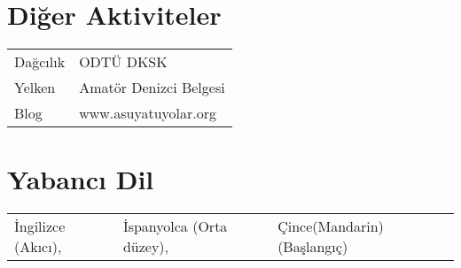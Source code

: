 \documentclass[a4paper,12pt]{article}
\begin{document}
\section{Diğer Aktiviteler}
%
 \begin{tabular}{ll}
Dağcılık & ODTÜ DKSK\\
Yelken & Amatör Denizci Belgesi\\
Blog & www.asuyatuyolar.org\\
\end{tabular}

\section{Yabancı Dil}
\begin{tabular}{lll} 
İngilizce (Akıcı), & İspanyolca (Orta düzey), & Çince(Mandarin) (Başlangıç)
\end{tabular}

\clearpage

\begin{publications}
\end{publications}


\end{document}
